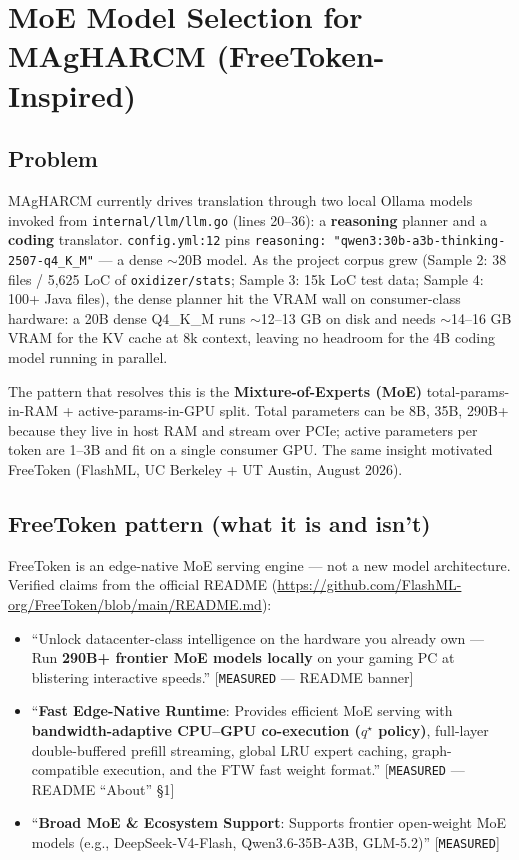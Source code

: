 \section{MoE Model Selection for MAgHARCM (FreeToken-Inspired)}
\label{app:freetoken}

\subsection{Problem}

MAgHARCM currently drives translation through two local Ollama models invoked
from \texttt{internal/llm/llm.go} (lines 20--36): a \textbf{reasoning} planner
and a \textbf{coding} translator. \texttt{config.yml:12} pins
\texttt{reasoning: "qwen3:30b-a3b-thinking-2507-q4_K_M"} --- a dense $\sim$20B model. As the project
corpus grew (Sample 2: 38 files / 5,625 LoC of \texttt{oxidizer/stats}; Sample 3:
15k LoC test data; Sample 4: 100+ Java files), the dense planner hit the VRAM
wall on consumer-class hardware: a 20B dense Q4\_K\_M runs $\sim$12--13 GB on
disk and needs $\sim$14--16 GB VRAM for the KV cache at 8k context, leaving no
headroom for the 4B coding model running in parallel.

The pattern that resolves this is the \textbf{Mixture-of-Experts (MoE)}
total-params-in-RAM + active-params-in-GPU split. Total parameters can be 8B,
35B, 290B+ because they live in host RAM and stream over PCIe; active parameters
per token are 1--3B and fit on a single consumer GPU. The same insight motivated
FreeToken (FlashML, UC Berkeley + UT Austin, August 2026).

\subsection{FreeToken pattern (what it is and isn't)}

FreeToken is an edge-native MoE serving engine --- not a new model architecture.
Verified claims from the official README
(\url{https://github.com/FlashML-org/FreeToken/blob/main/README.md}):

\begin{itemize}
\item ``Unlock datacenter-class intelligence on the hardware you already own ---
  Run \textbf{290B+ frontier MoE models locally} on your gaming PC at blistering
  interactive speeds.'' [\texttt{MEASURED} --- README banner]
\item ``\textbf{Fast Edge-Native Runtime}: Provides efficient MoE serving with
  \textbf{bandwidth-adaptive CPU--GPU co-execution ($q^\star$ policy)}, full-layer
  double-buffered prefill streaming, global LRU expert caching,
  graph-compatible execution, and the FTW fast weight format.''
  [\texttt{MEASURED} --- README ``About'' \S1]
\item ``\textbf{Broad MoE \& Ecosystem Support}: Supports frontier open-weight MoE
  models (e.g., DeepSeek-V4-Flash, Qwen3.6-35B-A3B, GLM-5.2)'' [\texttt{MEASURED}]
\end{itemize}

